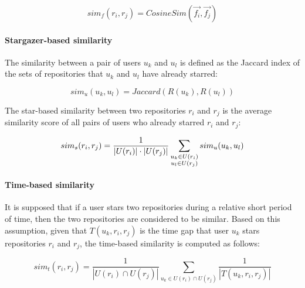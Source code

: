 \begin{equation}
sim_{f}(r_{i},r_{j})=CosineSim(\vec{f_{i}},\vec{f_{j}})
\end{equation}


\paragraph{Stargazer-based similarity}

The similarity between a pair of users $ u_{k} $ and $ u_{l} $ is defined as the Jaccard index \cite{jaccard} of the sets of repositories that $ u_{k} $ and $ u_{l} $ have already starred:%

\begin{equation} \label{eqn:StarBasedSim}
sim_{u}(u_{k},u_{l})=Jaccard(R(u_{k}),R(u_{l}))
\end{equation}

The star-based similarity between two repositories $ r_{i} $ and $ r_{j} $ is the average similarity score of all pairs of users who already starred $ r_{i} $ and $ r_{j} $:%

\begin{equation} %
sim_{s}(r_i,r_j) = \frac{1}{|U(r_{i})|\cdot |U(r_{j})|}\sum_{\substack{u_k\in U(r_i)\\
		u_l\in U(r_j)}}sim_{u}(u_k,u_l)\\
\end{equation}


\paragraph{Time-based similarity} It is supposed that if a user stars two repositories during a relative short period of time, then the two repositories are considered to be similar. Based on this assumption, given that $T(u_{k},r_{i},r_{j})$ is the time gap that user $u_{k}$ stars repositories $r_{i}$ and $r_{j}$, the time-based similarity is computed as follows:%


\begin{equation} %
sim_{t}(r_i,r_j) = \frac{1}{|U(r_{i}) \cap U(r_{j})|}\sum_{u_k\in U(r_{i}) \cap U(r_{j})}\frac{1}{|T(u_k,r_i,r_j)|}
\end{equation}

